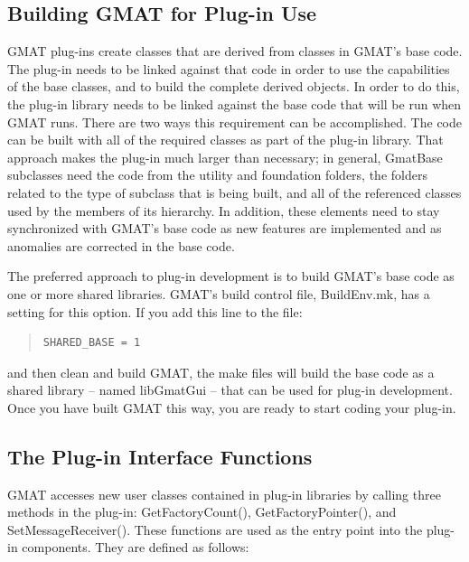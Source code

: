 \documentclass[letterpaper,10pt]{article}
\begin{document}
\subsection{Building GMAT for Plug-in Use}

GMAT plug-ins create classes that are derived from classes in GMAT's base code.  The plug-in needs
to be linked against that code in order to use the capabilities of the base classes, and to build
the complete derived objects.  In order to do this, the plug-in library needs to be linked against
the base code that will be run when GMAT runs.  There are two ways this requirement can be
accomplished.  The code can be built with all of the required classes as part of the plug-in
library.  That approach makes the plug-in much larger than necessary; in general, GmatBase
subclasses need the code from the utility and foundation folders, the folders related to the type
of subclass that is being built, and all of the referenced classes used by the members of its
hierarchy.  In addition, these elements need to stay synchronized with GMAT's base code as new
features are implemented and as anomalies are corrected in the base code.

The preferred approach to plug-in development is to build GMAT's base code as one or more shared
libraries.  GMAT's build control file, BuildEnv.mk, has a setting for this option.  If you add this
line to the file:

\begin{quote}
\begin{verbatim}
SHARED_BASE = 1
\end{verbatim}
\end{quote}

\noindent and then clean and build GMAT, the make files will build the base code as a shared library
-- named libGmatGui -- that can be used for plug-in development.  Once you have built GMAT this
way, you are ready to start coding your plug-in.

\subsection{The Plug-in Interface Functions}

GMAT accesses new user classes contained in plug-in libraries by calling three methods in the
plug-in: GetFactoryCount(), GetFactoryPointer(), and SetMessageReceiver().  These functions are
used as the entry point into the plug-in components.  They are defined as follows:
\end{document}
